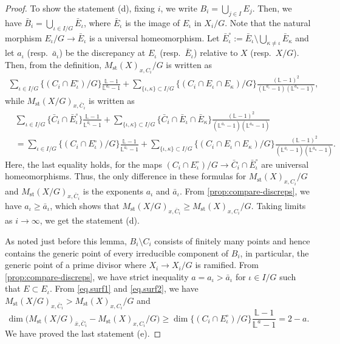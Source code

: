 \documentclass[12pt]{amsart}
\theoremstyle{plain}   %
\theoremstyle{definition}    %
\theoremstyle{remark}    %
\numberwithin{equation}{theorem}
\DeclareMathOperator{\st}{\mathrm{st}}
\newcommand{\bL}{\mathbb{L}}
\begin{document}
\begin{lemma}
\begin{proof}
To show the  statement (d), fixing $i$, we write $B_i = \bigcup_{j\in I} E_j$. Then, we have $\bar{B}_i = \bigcup_{\iota \in I/G} \bar{E}_\iota$, where $\bar{E}_\iota$ is the image of $E_\iota$ in $X_i/G$.
Note that the natural morphism $E_\iota/G\to \bar{E}_\iota$ is a universal homeomorphism.
Let $\bar{E}_\iota^\circ:=\bar{E}_\iota \setminus \bigcup _{\kappa \ne \iota} \bar{E}_\kappa$ and let $a_\iota$ (resp.\ $\bar{a}_\iota$) be the discrepancy at $E_\iota$ (resp.\ $\bar{E}_\iota$) relative to $X$ (resp.\ $X/G$).
Then, from the definition, $M_{\st}(X)_{x,C_i}/G$ is written as
\begin{align}\label{eq.surf1}
 \sum_{\iota\in I/G}\{(C_i \cap E_\iota^\circ)/G\}\frac{\bL-1}{\bL^{a_{\iota}}-1} 
+\sum_{\{\iota, \kappa\}\subset I/G}\{(C_i\cap E_\iota\cap E_\kappa)/G\}\frac{(\bL-1)^{2}}{(\bL^{a_{\iota}}-1)(\bL^{a_{\kappa}}-1)} ,
\end{align}
while $M_{\st}(X/G)_{x,\bar{C}_i}$ is written as
\begin{equation}\label{eq.surf2}
\begin{aligned}
& \sum_{\iota\in I/G}\{\bar{C}_i \cap \bar{E}_\iota^\circ\}\frac{\bL-1}{\bL^{\bar{a}_{\iota}}-1} 
+\sum_{\{\iota, \kappa\}\subset I/G}\{\bar{C}_i\cap \bar{E}_\iota\cap \bar{E}_\kappa\}\frac{(\bL-1)^{2}}{(\bL^{\bar{a}_{\iota}}-1)(\bL^{\bar{a}_{\kappa}}-1)}\\
& = \sum_{\iota\in I/G}\{(C_i \cap E_\iota^\circ)/G\}\frac{\bL-1}{\bL^{\bar{a}_{\iota}}-1} 
+\sum_{\{\iota, \kappa\}\subset I/G}\{(C_i\cap E_\iota\cap E_\kappa)/G\}\frac{(\bL-1)^{2}}{(\bL^{\bar{a}_{\iota}}-1)(\bL^{\bar{a}_{\kappa}}-1)}.
\end{aligned}
\end{equation}
Here, the last equality holds, for the maps $(C_i \cap E_\iota ^\circ)/G\to \bar{C}_i\cap \bar{E}_\iota^\circ$ are universal homeomorphisms.
Thus, the only difference in these formulas for $M_{\st}(X)_{x,C_i}/G$ and $M_{\st}(X/G)_{x,\bar{C}_i}$ is the exponents $a_\iota$ and $\bar{a}_\iota$. From \autoref{prop:compare-discreps}, we have $a_\iota \ge \bar{a}_\iota$,  which shows that $M_{\st}(X/G)_{x,\bar{C}_i}\ge M_{\st}(X)_{x,C_i}/G$. Taking  limits as $i\to \infty$, we get the statement (d). 

As noted just before this lemma, $B_i\setminus C_i$ consists of finitely many points and hence contains the generic point of every irreducible component of $B_i$, in particular, the generic point of a prime divisor where $X_i \to X_i/G$ is ramified. 
From \autoref{prop:compare-discreps}, we have strict inequality $a = a_\iota > \bar{a}_\iota $ for $\iota \in I/G$ such that $E\subset E_\iota$. 
From \autoref{eq.surf1} and \autoref{eq.surf2}, we have $M_{\st}(X/G)_{x,\bar{C}_i}> M_{\st}(X)_{x,C_i}/G$ and
\[
\dim\big(M_{\st}(X/G)_{\bar{x},\bar{C}_i} - M_{\st}(X)_{x,C_i}/G\big) \ge 
\dim \{(C_i \cap E_\iota^\circ)/G\}\frac{\bL-1}{\bL^a-1} = 2-a.
\]
We have proved the last statement (e). 
\end{proof}
\end{lemma}
\end{document}
